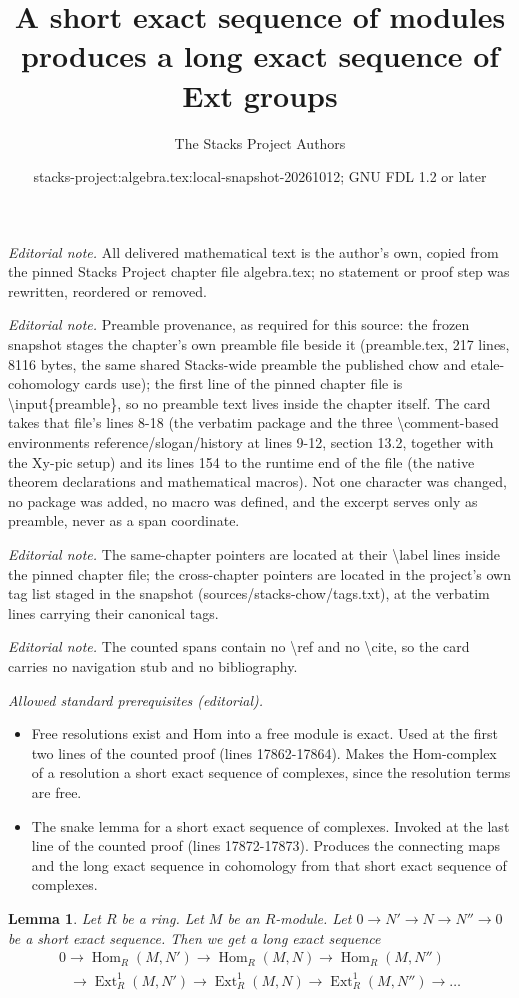\documentclass[10pt,a4paper]{amsart}
\title{A short exact sequence of modules produces a long exact sequence of Ext groups}
\author{The Stacks Project Authors}
\date{stacks-project:algebra.tex:local-snapshot-20261012; GNU FDL 1.2 or later}
\theoremstyle{plain}
\newtheorem{lemma}[subsection]{Lemma}
\theoremstyle{definition}
\theoremstyle{remark}
\numberwithin{equation}{subsection}
\def\Hom{\mathop{\mathrm{Hom}}\nolimits}
\def\Ext{\mathop{\mathrm{Ext}}\nolimits}
\begin{document}
\maketitle
\noindent\textit{Editorial note.} All delivered mathematical text is the author's own, copied from the pinned Stacks Project chapter file algebra.tex; no statement or proof step was rewritten, reordered or removed.\par\medskip
\noindent\textit{Editorial note.} Preamble provenance, as required for this source: the frozen snapshot stages the chapter's own preamble file beside it (preamble.tex, 217 lines, 8116 bytes, the same shared Stacks-wide preamble the published chow and etale-cohomology cards use); the first line of the pinned chapter file is \textbackslash{}input\{preamble\}, so no preamble text lives inside the chapter itself. The card takes that file's lines 8-18 (the verbatim package and the three \textbackslash{}comment-based environments reference/slogan/history at lines 9-12, section 13.2, together with the Xy-pic setup) and its lines 154 to the runtime end of the file (the native theorem declarations and mathematical macros). Not one character was changed, no package was added, no macro was defined, and the excerpt serves only as preamble, never as a span coordinate.\par\medskip
\noindent\textit{Editorial note.} The same-chapter pointers are located at their \textbackslash{}label lines inside the pinned chapter file; the cross-chapter pointers are located in the project's own tag list staged in the snapshot (sources/stacks-chow/tags.txt), at the verbatim lines carrying their canonical tags.\par\medskip
\noindent\textit{Editorial note.} The counted spans contain no \textbackslash{}ref and no \textbackslash{}cite, so the card carries no navigation stub and no bibliography.\par\medskip
\noindent\textit{Allowed standard prerequisites (editorial).}\begin{itemize}
\item Free resolutions exist and Hom into a free module is exact. Used at the first two lines of the counted proof (lines 17862-17864). Makes the Hom-complex of a resolution a short exact sequence of complexes, since the resolution terms are free.
\item The snake lemma for a short exact sequence of complexes. Invoked at the last line of the counted proof (lines 17872-17873). Produces the connecting maps and the long exact sequence in cohomology from that short exact sequence of complexes.
\end{itemize}\medskip
\begin{lemma}
\label{lemma-long-exact-seq-ext}
Let $R$ be a ring. Let $M$ be an $R$-module.
Let $0 \to N' \to N \to N'' \to 0$ be a
short exact sequence. Then we get a long exact
sequence
$$
\begin{matrix}
0
\to \Hom_R(M, N')
\to \Hom_R(M, N)
\to \Hom_R(M, N'')
\\
\phantom{0\ }
\to \Ext^1_R(M, N')
\to \Ext^1_R(M, N)
\to \Ext^1_R(M, N'')
\to \ldots
\end{matrix}
$$
\end{lemma}
\end{document}
